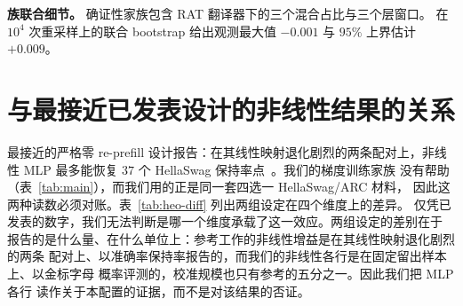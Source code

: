 \documentclass[10pt,a4paper,fontset=fandol]{ctexart}
\begin{document}
\begin{table}[h]
\centering
\caption{主配对上的教师内容探针，$n{=}30$。Gold 列为混合后的金标字母概率；CHG
相对学生自身 prefill。第一行是学生自身的缓存。两种翻译器一致认为：每个探针
要么退化要么中性，且替换顶部三分之一的层是中性的。}
\label{tab:probes}
\end{table}

\textbf{族联合细节。} 确证性家族包含 RAT 翻译器下的三个混合占比与三个层窗口。
在 $10^4$ 次重采样上的联合 bootstrap 给出观测最大值 $-0.001$ 与 $95\%$ 上界估计
$+0.009$。

\section{与最接近已发表设计的非线性结果的关系}
\label{app:heo-mlp}

最接近的严格零 re-prefill 设计报告：在其线性映射退化剧烈的两条配对上，非线性
MLP 最多能恢复 $37$ 个 HellaSwag 保持率点~\citep{heo2026}。我们的梯度训练家族
没有帮助（表~\ref{tab:main}），而我们用的正是同一套四选一 HellaSwag/ARC 材料，
因此这两种读数必须对账。表~\ref{tab:heo-diff} 列出两组设定在四个维度上的差异。
仅凭已发表的数字，我们无法判断是哪一个维度承载了这一效应。两组设定的差别在于
报告的是什么量、在什么单位上：参考工作的非线性增益是在其线性映射退化剧烈的两条
配对上、以准确率保持率报告的，而我们的非线性各行是在固定留出样本上、以金标字母
概率评测的，校准规模也只有参考的五分之一。因此我们把 MLP 各行
读作关于本配置的证据，而不是对该结果的否证。
\end{document}

